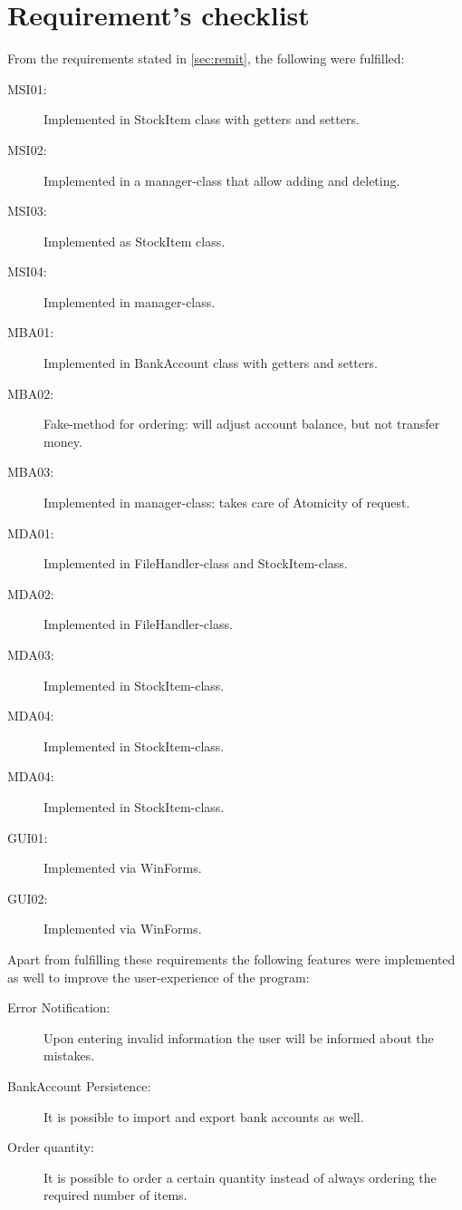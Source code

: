 \chapter{Requirement's checklist}\label{ch:requirements} %

From the requirements stated in \autoref{sec:remit}, the following were fulfilled:

\begin{description}
\item[MSI01:] Implemented in StockItem class with getters and setters.
\item[MSI02:] Implemented in a manager-class that allow adding and deleting.
\item[MSI03:] Implemented as StockItem class.
\item[MSI04:] Implemented in manager-class.
\item[MBA01:] Implemented in BankAccount class with getters and setters.
\item[MBA02:] Fake-method for ordering: will adjust account balance, but not transfer money.
\item[MBA03:] Implemented in manager-class: takes care of Atomicity of request.
\item[MDA01:] Implemented in FileHandler-class and StockItem-class.
\item[MDA02:] Implemented in FileHandler-class.
\item[MDA03:] Implemented in StockItem-class.
\item[MDA04:] Implemented in StockItem-class.
\item[MDA04:] Implemented in StockItem-class.
\item[GUI01:] Implemented via WinForms.
\item[GUI02:] Implemented via WinForms.
\end{description}

Apart from fulfilling these requirements the following features were implemented as well to improve the user-experience of the program:

\begin{description}
\item[Error Notification:] Upon entering invalid information the user will be informed about the mistakes.
\item[BankAccount Persistence:] It is possible to import and export bank accounts as well.
\item[Order quantity:] It is possible to order a certain quantity instead of always ordering the required number of items.
\end{description}